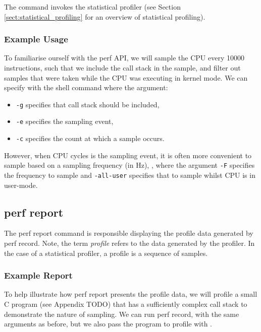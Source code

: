 The  command invokes the statistical profiler (see Section \ref{sect:statistical_profiling} for an overview of statistical profiling). 

\subsubsection{Example Usage}

To familiarise ourself with the perf API, we will sample the CPU every 10000 instructions, such that we include the call stack in the sample, and filter out samples that were taken while the CPU was executing in kernel mode. We can specify with the shell command  where the argument:
\ssp
\begin{itemize}
    \item \texttt{-g} specifies that call stack should be included,
    \item \texttt{-e} specifies the sampling event,
    \item \texttt{-c} specifies the count at which a sample occurs. 
\end{itemize}
\dsp

However, when CPU cycles is the sampling event, it is often more convenient to sample based on a sampling frequency (in Hz), , where the argument \texttt{-F} specifies the frequency to sample and \texttt{-all-user} specifies that to sample whilst CPU is in user-mode. 

\subsection{perf report}\label{sect:perf_report}

The perf report command is responsible displaying the profile data generated by perf record. Note, the term \textit{profile} refers to the data generated by the profiler. In the case of a statistical profiler, a profile is a sequence of samples.

\subsubsection{Example Report}

To help illustrate how perf report presents the profile data, we will profile a small C program (see Appendix TODO) that has a sufficiently complex call stack to demonstrate the nature of sampling. We can run perf record, with the same arguments as before, but we also pass the program to profile with .

